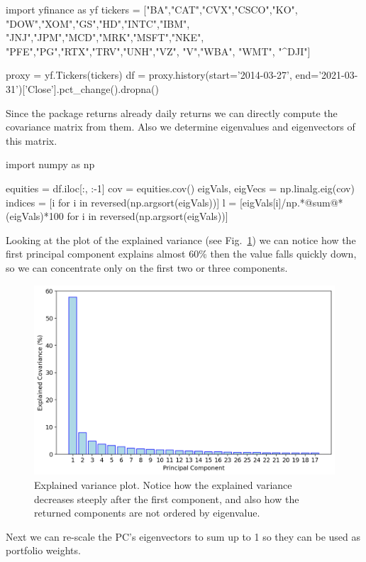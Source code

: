 \begin{ipython}
import yfinance as yf
tickers = ["BA","CAT","CVX","CSCO","KO",
           "DOW","XOM","GS","HD","INTC","IBM",
           "JNJ","JPM","MCD","MRK","MSFT","NKE",
           "PFE","PG","RTX","TRV","UNH","VZ",
           "V","WBA", "WMT", "^DJI"]

proxy = yf.Tickers(tickers)           
df = proxy.history(start='2014-03-27',
                   end='2021-03-31')['Close'].pct_change().dropna()
\end{ipython}
	
Since the package returns already daily returns we can directly compute the covariance matrix from them. Also we determine eigenvalues and eigenvectors of this matrix.

\begin{ipython}
import numpy as np

equities = df.iloc[:, :-1]
cov = equities.cov()
eigVals, eigVecs = np.linalg.eig(cov)
indices = [i for i in reversed(np.argsort(eigVals))]
l = [eigVals[i]/np.*@sum@*(eigVals)*100 for i in reversed(np.argsort(eigVals))]
\end{ipython}
	
Looking at the plot of the explained variance (see Fig.~\ref{fig:explained_variance}) we can notice how the first principal component explains almost 60\% then the value falls quickly down, so we can concentrate only on the first two or three components.

\begin{figure}[htb]
	\centering
	\includegraphics[width=.7\textwidth]{figures/portfolio_pca_expl_var}
	\caption{Explained variance plot. Notice how the explained variance decreases steeply after the first component, and also how the returned components are not ordered by eigenvalue.}
	\label{fig:explained_variance}
\end{figure}
		
Next we can re-scale the PC's eigenvectors to sum up to 1 so they can be used as portfolio weights.
	
